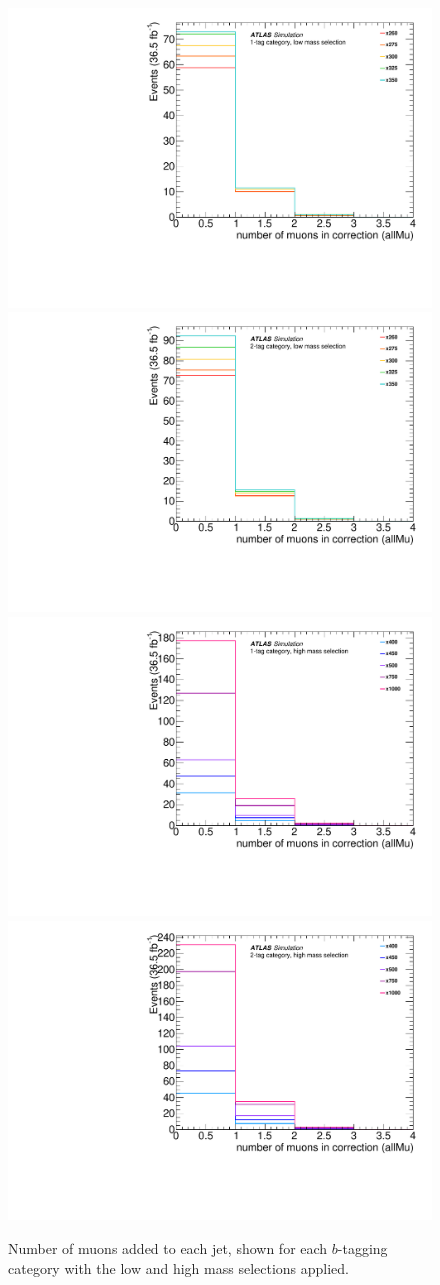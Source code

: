 \begin{figure}[!ht]
  \centering
  \includegraphics[height=0.32\textwidth]{chapters/chapter5_yybb/images/muon-in-jet/all_mu_n_allMu_low_1.pdf}
  \includegraphics[height=0.32\textwidth]{chapters/chapter5_yybb/images/muon-in-jet/all_mu_n_allMu_low_2.pdf} \\
  \includegraphics[height=0.32\textwidth]{chapters/chapter5_yybb/images/muon-in-jet/all_mu_n_allMu_high_1.pdf}
  \includegraphics[height=0.32\textwidth]{chapters/chapter5_yybb/images/muon-in-jet/all_mu_n_allMu_high_2.pdf} \\
  \caption[Number of muons added to each jet, shown for each $b$-tagging category with the low and high mass  selections applied]{Number of muons added to each jet, shown for each $b$-tagging category with the low and high mass  selections applied.}
  \label{fig:n_muons}
\end{figure}


